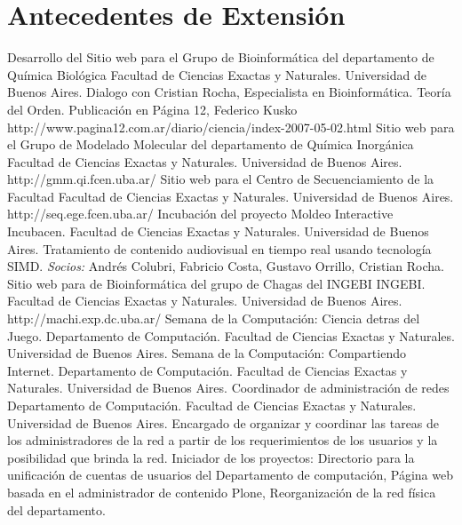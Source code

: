 \section{Antecedentes de Extensión}

	{Desarrollo del Sitio web para el Grupo de Bioinformática del departamento de Química Biológica}
	{Facultad de Ciencias Exactas y Naturales. Universidad de Buenos Aires. }
	{}
	{}
	{}
	{Dialogo con Cristian Rocha, Especialista en Bioinformática. Teoría del Orden.}
	{Publicación en Página 12, Federico Kusko}
	{}
	{}
	{http://www.pagina12.com.ar/diario/ciencia/index-2007-05-02.html}
	{Sitio web para el Grupo de Modelado Molecular del departamento de Química Inorgánica}
	{Facultad de Ciencias Exactas y Naturales. Universidad de Buenos Aires.}
	{}
	{}
	{http://gmm.qi.fcen.uba.ar/}
	{Sitio web para el Centro de Secuenciamiento de la Facultad}
	{Facultad de Ciencias Exactas y Naturales. Universidad de Buenos Aires.}
	{}
	{}
	{http://seq.ege.fcen.uba.ar/}
	{Incubación del proyecto Moldeo Interactive}
	{Incubacen. Facultad de Ciencias Exactas y Naturales. Universidad de Buenos Aires.}
	{}
	{}
	{Tratamiento de contenido audiovisual en tiempo real usando tecnología SIMD. \emph{Socios:} Andrés Colubri, Fabricio Costa, Gustavo Orrillo, Cristian Rocha.}
	{Sitio web para de Bioinformática del grupo de Chagas del INGEBI}
	{INGEBI. Facultad de Ciencias Exactas y Naturales. Universidad de Buenos Aires. }
	{}
	{}
	{http://machi.exp.dc.uba.ar/}
	{Semana de la Computación: Ciencia detras del Juego.}
	{Departamento de Computación. Facultad de Ciencias Exactas y Naturales. Universidad de Buenos Aires.}
	{}
	{}
	{}
	{Semana de la Computación: Compartiendo Internet.}
	{Departamento de Computación. Facultad de Ciencias Exactas y Naturales. Universidad de Buenos Aires.}
	{}
	{}
	{}
	{Coordinador de administración de redes}
	{Departamento de Computación. Facultad de Ciencias Exactas y Naturales. Universidad de Buenos Aires.}
	{}
	{}
	{Encargado de organizar y coordinar las tareas de los
 	administradores de la red a partir de los requerimientos de los usuarios y
 	la posibilidad que brinda la red. Iniciador de los proyectos: Directorio
 	para la unificación de cuentas de usuarios del Departamento de computación,
 	Página web basada en el administrador de contenido Plone, Reorganización
	de la red física del departamento.}


